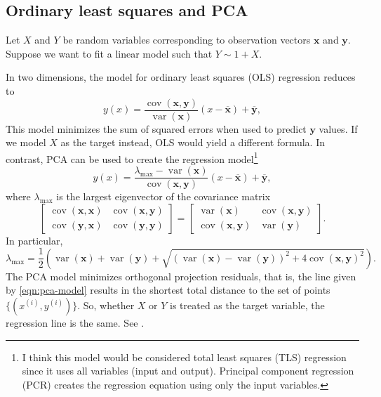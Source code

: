 \subsection{Ordinary least squares and PCA}
\def\vb#1{\mathbf{#1}}
Let \(X\) and \(Y\) be random variables corresponding to observation vectors \(\vb{x}\) and \(\vb{y}\).
Suppose we want to fit a linear model such that \(Y \sim 1 + X\).

In two dimensions, the model for ordinary least squares (OLS) regression reduces to
\def\cov{\operatorname{cov}}
\def\Var{\operatorname{var}}
\begin{equation}
    \label{eqn:ols-model}
    y(x) = \frac{\cov(\vb{x},\vb{y})}{\Var(\vb{x})}(x - \overline{\vb{x}}) + \overline{\vb{y}},
\end{equation}
This model minimizes the sum of squared errors when used to predict \(\vb{y}\) values.
If we model \(X\) as the target instead, OLS would yield a different formula.
In contrast, PCA can be used to create the regression model\footnote{I think this model would be considered total least squares (TLS) regression since it uses all variables (input and output). Principal component regression (PCR) creates the regression equation using only the input variables.}
\begin{equation}
    \label{eqn:pca-model}
    y(x) = \frac{\lambda_{\max} - \Var({\vb{x}})}{\cov(\vb{x},\vb{y})}(x - \overline{\vb{x}}) + \overline{\vb{y}},
\end{equation}
where \(\lambda_{\max}\) is the largest eigenvector of the covariance matrix
\[\begin{bmatrix}
    \cov(\vb{x}, \vb{x}) & \cov(\vb{x}, \vb{y}) \\
    \cov(\vb{y}, \vb{x}) & \cov(\vb{y}, \vb{y})
\end{bmatrix} = \begin{bmatrix}
    \Var(\vb{x}) & \cov(\vb{x}, \vb{y}) \\
    \cov(\vb{x}, \vb{y}) & \Var(\vb{y})
\end{bmatrix}.\]
In particular,
\[\lambda_{\max} = \frac{1}{2}\left(\Var(\vb{x}) + \Var(\vb{y}) + \sqrt{(\Var(\vb{x}) - \Var(\vb{y}))^2 + 4\cov(\vb{x},\vb{y})^2}\right).\]
The PCA model minimizes orthogonal projection residuals, that is, the line given by \eqref{eqn:pca-model} results in the shortest total distance to the set of points \(\{(x^{(i)},y^{(i)})\}\).
So, whether \(X\) or \(Y\) is treated as the target variable, the regression line is the same.
See .

